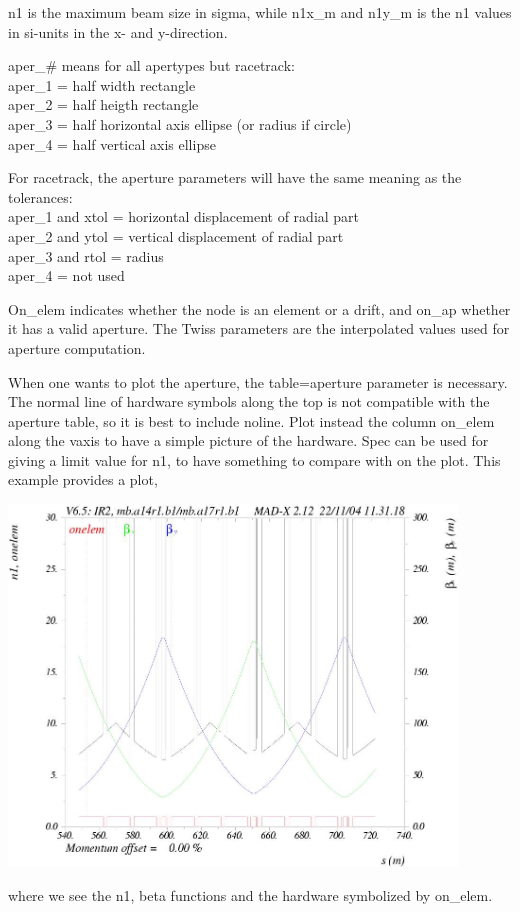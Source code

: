 n1 is the maximum beam size in sigma, while n1x\_m and n1y\_m is the n1
values in si-units in the x- and y-direction.  

aper\_\# means for all apertypes but racetrack:
\\ aper\_1 = half width rectangle
\\ aper\_2 = half heigth rectangle
\\ aper\_3 = half horizontal axis ellipse (or radius if circle)
\\ aper\_4 = half vertical axis ellipse

For racetrack, the aperture parameters will have the same meaning as the
tolerances: 
\\ aper\_1 and xtol = horizontal displacement of radial part 
\\ aper\_2 and ytol = vertical displacement of radial part 
\\ aper\_3 and rtol = radius 
\\ aper\_4 = not used 

On\_elem indicates whether the node is an element or a drift, and on\_ap
whether it has a valid aperture. The Twiss parameters are the
interpolated  values used for aperture computation.  

When one wants to plot the aperture, the table=aperture parameter is
necessary. The normal line of hardware symbols along the top is not
compatible with the aperture table, so it is best to include
noline. Plot instead the column on\_elem along the vaxis to have a
simple picture of the hardware. Spec can be used for giving a limit
value for n1, to have something to compare with on the plot. This
example  provides a plot,  

\includegraphics[width=450px]{Introduction/aperexample.jpg}

where we see the n1, beta functions and the hardware symbolized by
on\_elem.     



